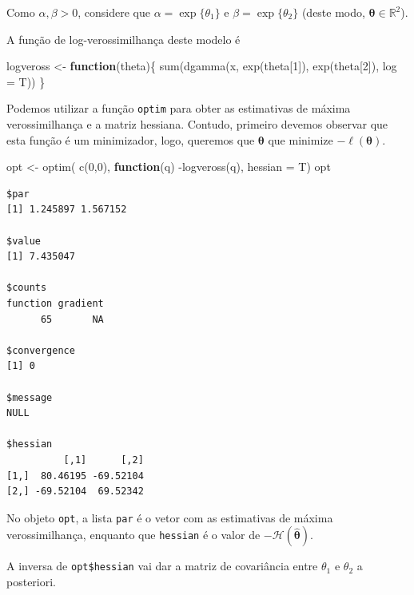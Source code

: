 \documentclass[
  letterpaper,
  DIV=11,
  numbers=noendperiod]{scrreprt}
\newenvironment{Shaded}{\begin{snugshade}}{\end{snugshade}}
\newcommand{\AttributeTok}[1]{\textcolor[rgb]{0.40,0.45,0.13}{#1}}
\newcommand{\ControlFlowTok}[1]{\textcolor[rgb]{0.00,0.23,0.31}{\textbf{#1}}}
\newcommand{\DecValTok}[1]{\textcolor[rgb]{0.68,0.00,0.00}{#1}}
\newcommand{\FunctionTok}[1]{\textcolor[rgb]{0.28,0.35,0.67}{#1}}
\newcommand{\NormalTok}[1]{\textcolor[rgb]{0.00,0.23,0.31}{#1}}
\newcommand{\OtherTok}[1]{\textcolor[rgb]{0.00,0.23,0.31}{#1}}
\newcommand{\SpecialCharTok}[1]{\textcolor[rgb]{0.37,0.37,0.37}{#1}}
\theoremstyle{definition}
\theoremstyle{plain}
\theoremstyle{definition}
\theoremstyle{remark}
\begin{document}
Como \(\alpha,\beta>0\), considere que \(\alpha=\exp\{\theta_1\}\) e
\(\beta=\exp\{\theta_2\}\) (deste modo,
\(\boldsymbol{\theta}\in\mathbb{R}^2\)).

A função de log-verossimilhança deste modelo é

\begin{Shaded}
\begin{Highlighting}[]
\NormalTok{logveross }\OtherTok{\textless{}{-}} \ControlFlowTok{function}\NormalTok{(theta)\{ }\FunctionTok{sum}\NormalTok{(}\FunctionTok{dgamma}\NormalTok{(x, }\FunctionTok{exp}\NormalTok{(theta[}\DecValTok{1}\NormalTok{]), }\FunctionTok{exp}\NormalTok{(theta[}\DecValTok{2}\NormalTok{]), }\AttributeTok{log =}\NormalTok{ T))}
\NormalTok{\}}
\end{Highlighting}
\end{Shaded}

Podemos utilizar a função \texttt{optim} para obter as estimativas de
máxima verossimilhança e a matriz hessiana. Contudo, primeiro devemos
observar que esta função é um minimizador, logo, queremos que
\(\boldsymbol{\theta}\) que minimize \(-\ell({\boldsymbol{\theta}})\).

\begin{Shaded}
\begin{Highlighting}[]
\NormalTok{opt }\OtherTok{\textless{}{-}} \FunctionTok{optim}\NormalTok{( }\FunctionTok{c}\NormalTok{(}\DecValTok{0}\NormalTok{,}\DecValTok{0}\NormalTok{), }\ControlFlowTok{function}\NormalTok{(q) }\SpecialCharTok{{-}}\FunctionTok{logveross}\NormalTok{(q), }\AttributeTok{hessian =}\NormalTok{ T)}
\NormalTok{opt}
\end{Highlighting}
\end{Shaded}

\begin{verbatim}
$par
[1] 1.245897 1.567152

$value
[1] 7.435047

$counts
function gradient 
      65       NA 

$convergence
[1] 0

$message
NULL

$hessian
          [,1]      [,2]
[1,]  80.46195 -69.52104
[2,] -69.52104  69.52342
\end{verbatim}

No objeto \texttt{opt}, a lista \texttt{par} é o vetor com as
estimativas de máxima verossimilhança, enquanto que \texttt{hessian} é o
valor de \(-\mathcal{H}(\hat{\boldsymbol{\theta}})\).

A inversa de \texttt{opt\$hessian} vai dar a matriz de covariância entre
\(\theta_1\) e \(\theta_2\) a posteriori.
\end{document}
